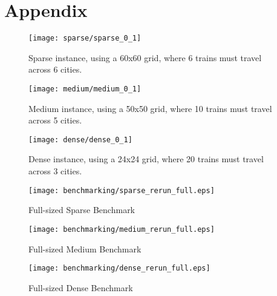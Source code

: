 \appendix
\clearpage
\section{Appendix}
\label{sec:appendix}

\begin{figure}[h]
	\centering
	\texttt{[image: sparse/sparse\_0\_1]}
	\caption{Sparse instance, using a 60x60 grid, where 6 trains must travel across 6 cities.}
	\label{sparse_0_1_fullpage}
\end{figure}

\begin{figure}[h]
	\centering
	\texttt{[image: medium/medium\_0\_1]}
	\caption{Medium instance, using a 50x50 grid, where 10 trains must travel across 5 cities.}
	\label{medium_0_1_fullpage}
\end{figure}

\begin{figure}[h]
	\centering
	\texttt{[image: dense/dense\_0\_1]}
	\caption{Dense instance, using a 24x24 grid, where 20 trains must travel across 3 cities.}
	\label{dense_0_1_fullpage}
\end{figure}

\begin{figure}[h]
	\centering
	\texttt{[image: benchmarking/sparse\_rerun\_full.eps]}
	\caption{Full-sized Sparse Benchmark}
	\label{dense_0_1_fullpage}
\end{figure}

\begin{figure}[h]
	\centering
	\texttt{[image: benchmarking/medium\_rerun\_full.eps]}
	\caption{Full-sized Medium Benchmark}
	\label{dense_0_1_fullpage}
\end{figure}

\begin{figure}[h]
	\centering
	\texttt{[image: benchmarking/dense\_rerun\_full.eps]}
	\caption{Full-sized Dense Benchmark}
	\label{dense_0_1_fullpage}
\end{figure}